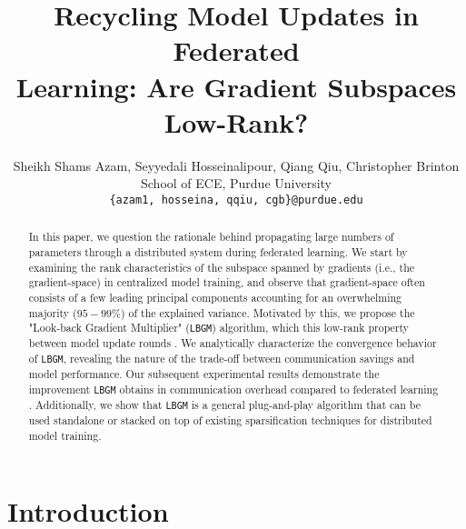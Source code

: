 \documentclass{article}
\title{Recycling Model Updates in Federated \\Learning: Are Gradient Subspaces Low-Rank?}
\author{Sheikh Shams Azam, Seyyedali Hosseinalipour, Qiang Qiu, Christopher Brinton\\
School of ECE, Purdue University\\
\texttt{\{azam1, hosseina, qqiu, cgb\}@purdue.edu} \\
}
\newcommand{\shams}[1]{{\color{red}{#1}}}
\renewcommand{\shams}[1]{{\color{black}{#1}}}
\begin{document}
\maketitle
\doparttoc
\faketableofcontents


\vspace{-2mm}
\begin{abstract}
  In this paper, we question the rationale behind propagating large numbers of parameters through a distributed system during federated learning. We start by examining the rank characteristics of the subspace spanned by gradients \shams{across epochs} (i.e., the gradient-space) in centralized model training, and observe that \shams{this} gradient-space often consists of a few leading principal components accounting for an overwhelming majority ($95-99\%$) of the explained variance. Motivated by this, we propose the "Look-back Gradient Multiplier" ({\tt LBGM}) algorithm, which \shams{exploits} this low-rank property \shams{to enable gradient recycling} between model update rounds \shams{of federated learning, reducing transmissions of large parameters to single scalars for aggregation}. We analytically characterize the convergence behavior of {\tt LBGM}, revealing the nature of the trade-off between communication savings and model performance. Our subsequent experimental results demonstrate the improvement {\tt LBGM} obtains in communication overhead compared to \shams{conventional }federated learning \shams{on several datasets and deep learning models}. Additionally, we show that {\tt LBGM} is a general plug-and-play algorithm that can be used standalone or stacked on top of existing sparsification techniques for distributed model training.
\end{abstract}



\section{Introduction}
\vspace{-1mm}
\end{document}
